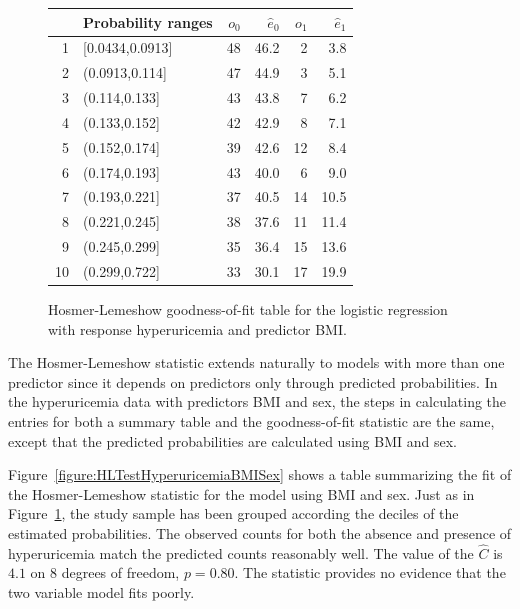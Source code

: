 \begin{figure}[ht]
\centering
\begin{tabular}{rlrrrr}
  \hline
 & Probability ranges & ${o}_0$ & $\hat{e}_0$ & $o_1$ & $\hat{e}_1$ \\
  \hline
1 & [0.0434,0.0913] & 48 & 46.2 & 2 & 3.8 \\
  2 & (0.0913,0.114] & 47 & 44.9 & 3 & 5.1 \\
  3 & (0.114,0.133] & 43 & 43.8 & 7 & 6.2 \\
  4 & (0.133,0.152] & 42 & 42.9 & 8 & 7.1 \\
  5 & (0.152,0.174] & 39 & 42.6 & 12 & 8.4 \\
  6 & (0.174,0.193] & 43 & 40.0 & 6 & 9.0 \\
  7 & (0.193,0.221] & 37 & 40.5 & 14 & 10.5 \\
  8 & (0.221,0.245] & 38 & 37.6 & 11 & 11.4 \\
  9 & (0.245,0.299] & 35 & 36.4 & 15 & 13.6 \\
  10 & (0.299,0.722] & 33 & 30.1 & 17 & 19.9 \\
   \hline
\end{tabular}
\caption{Hosmer-Lemeshow goodness-of-fit table for the
       logistic regression with response hyperuricemia and predictor BMI.}
\label{figure:HLTestHyperuricemiaBmi}
\end{figure}

The Hosmer-Lemeshow statistic extends naturally to models with more than one predictor since it depends on predictors only through predicted probabilities. In the hyperuricemia data with predictors BMI and sex, the steps in calculating the entries for both a summary table and the goodness-of-fit statistic are the same, except that the predicted probabilities are calculated using BMI and sex.

Figure~\ref{figure:HLTestHyperuricemiaBMISex} shows a table summarizing the fit of the Hosmer-Lemeshow statistic for the model using BMI and sex.  Just as in Figure~\ref{figure:HLTestHyperuricemiaBmi}, the study sample has been grouped according the deciles of the estimated probabilities.  The observed counts for both the absence and presence of hyperuricemia match the predicted counts reasonably well.   The value of the $\hat{C}$ is $4.1$ on $8$ degrees of freedom, $p = 0.80$.  The statistic provides no evidence that the two variable model fits poorly.

